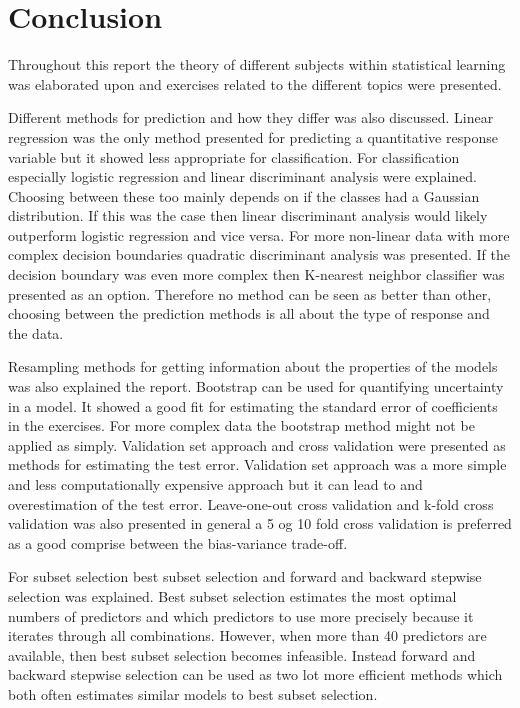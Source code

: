 \chapter{Conclusion}
\label{chp:conc}

Throughout this report the theory of different subjects within statistical learning was elaborated upon and exercises related to the different topics were presented. 

Different methods for prediction and how they differ was also discussed. Linear regression was the only method presented for predicting a quantitative response variable but it showed less appropriate for classification. For classification especially logistic regression and linear discriminant analysis were explained. Choosing between these too mainly depends on if the classes had a Gaussian distribution. If this was the case then linear discriminant analysis would likely outperform logistic regression and vice versa. For more non-linear data with more complex decision boundaries quadratic discriminant analysis was presented. If the decision boundary was even more complex then K-nearest neighbor classifier was presented as an option. Therefore no method can be seen as better than other, choosing between the prediction methods is all about the type of response and the data.

Resampling methods for getting information about the properties of the models was also explained the report. Bootstrap can be used for quantifying uncertainty in a model. It showed a good fit for estimating the standard error of coefficients in the exercises. For more complex data the bootstrap method might not be applied as simply.
Validation set approach and cross validation were presented as methods for estimating the test error. Validation set approach was a more simple and less computationally expensive approach but it can lead to and overestimation of the test error. Leave-one-out cross validation and k-fold cross validation was also presented in general a 5 og 10 fold cross validation is preferred as a good comprise between the bias-variance trade-off.

For subset selection best subset selection and forward and backward stepwise selection was explained. Best subset selection estimates the most optimal numbers of predictors and which predictors to use more precisely because it iterates through all combinations. However, when more than 40 predictors are available, then best subset selection becomes infeasible. Instead forward and backward stepwise selection can be used as two lot more efficient methods which both often estimates similar models to best subset selection.





